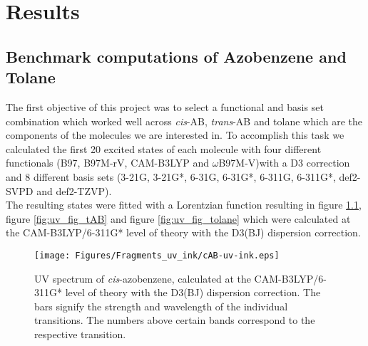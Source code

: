 \chapter{Results} \label{abs:ergebnis}
\section{Benchmark computations of Azobenzene and Tolane}
%
The first objective of this project was to select a functional and basis set combination which worked well across \textit{cis}-AB, \textit{trans}-AB and tolane which are the components of the molecules we are interested in. 
To accomplish this task we calculated the first 20 excited states of each molecule with four different functionals (B97, B97M-rV, CAM-B3LYP and $\omega$B97M-V)with a D3 correction and 8 different basis sets (3-21G, 3-21G*, 6-31G, 6-31G*, 6-311G, 6-311G*, def2-SVPD and def2-TZVP).\\
The resulting states were fitted with a Lorentzian function resulting in figure \ref{fig:uv_fig_cAB}, figure \ref{fig:uv_fig_tAB} and figure \ref{fig:uv_fig_tolane} which were calculated at the CAM-B3LYP/6-311G* level of theory with the D3(BJ) dispersion correction.
%
%
%
\begin{figure}[H]
    \centering
    \texttt{[image: Figures/Fragments\_uv\_ink/cAB-uv-ink.eps]}
    \caption{UV spectrum of \textit{cis}-azobenzene, calculated at the CAM-B3LYP/6-311G* level of theory with the D3(BJ) dispersion correction. 
    The bars signify the strength and wavelength of the individual transitions. 
    The numbers above certain bands correspond to the respective transition. }
    \label{fig:uv_fig_cAB}
\end{figure}

